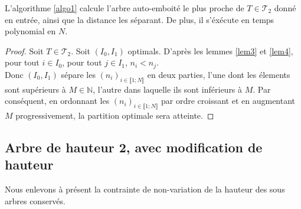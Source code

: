 \begin{thm}
  \label{thm1}
  L'algorithme \ref{algo1} calcule l'arbre auto-emboité le plus proche de $T \in
  \mathcal{T}_{2}$ donné en entrée, ainsi que la distance les
  séparant. De plus, il s'éxécute en temps polynomial en $N$.
  \begin{proof}
    Soit $T \in \mathcal{T}_{2}$. Soit $(I_{0}, I_{1})$
    optimals. D'après les lemmes \ref{lem3} et \ref{lem4}, pour tout
    $i \in I_{0}$, pour tout $j \in I_{1}$, $n_{i} < n_{j}$.\\
    Donc $(I_{0},I_{1})$ sépare les
    $(n_{i})_{i \in \llbracket 1;N \rrbracket}$ en deux parties, l'une
    dont les élements sont supérieurs à $M \in \mathbb{N}$, l'autre
    dans laquelle ils sont inférieurs à $M$. Par conséquent, en
    ordonnant les $(n_{i})_{i \in \llbracket 1;N \rrbracket}$ par
    ordre croissant et en augmentant $M$ progressivement, la partition
    optimale sera atteinte.
  \end{proof}
\end{thm}

\subsection{Arbre de hauteur 2, avec modification de hauteur}

Nous enlevons à présent la contrainte de non-variation de la hauteur
des sous arbres conservés.

